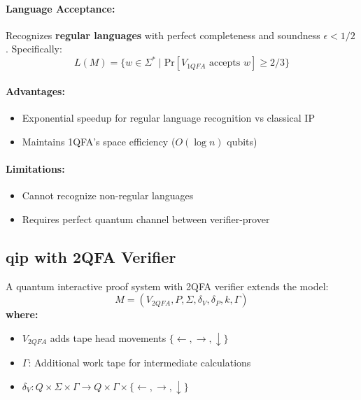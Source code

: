 \paragraph{Language Acceptance:}
Recognizes \textbf{regular languages} with perfect completeness and soundness $\epsilon < 1/2$ \cite{yakaryilmaz2013verification}. Specifically:
\[
L(M) = \{w \in \Sigma^* \mid \text{Pr}[V_{1QFA} \text{ accepts } w] \geq 2/3\}
\]

\paragraph{Advantages:}
\begin{itemize}
    \item Exponential speedup for regular language recognition vs classical IP
    \item Maintains 1QFA's space efficiency ($O(\log n)$ qubits)
\end{itemize}

\paragraph{Limitations:}
\begin{itemize}
    \item Cannot recognize non-regular languages
    \item Requires perfect quantum channel between verifier-prover
\end{itemize}

\subsection{\acrfull{qip} with 2QFA Verifier}
\label{subsec:qip2qfa}

\begin{definition}
A quantum interactive proof system with 2QFA verifier extends the model:
\[
M = (V_{2QFA}, P, \Sigma, \delta_V, \delta_P, k, \Gamma)
\]
\textbf{where:}
\begin{itemize}
    \item $V_{2QFA}$ adds tape head movements $\{\leftarrow, \rightarrow, \downarrow\}$
    \item $\Gamma$: Additional work tape for intermediate calculations
    \item $\delta_V: Q \times \Sigma \times \Gamma \rightarrow Q \times \Gamma \times \{\leftarrow, \rightarrow, \downarrow\}$
\end{itemize}
\end{definition}

